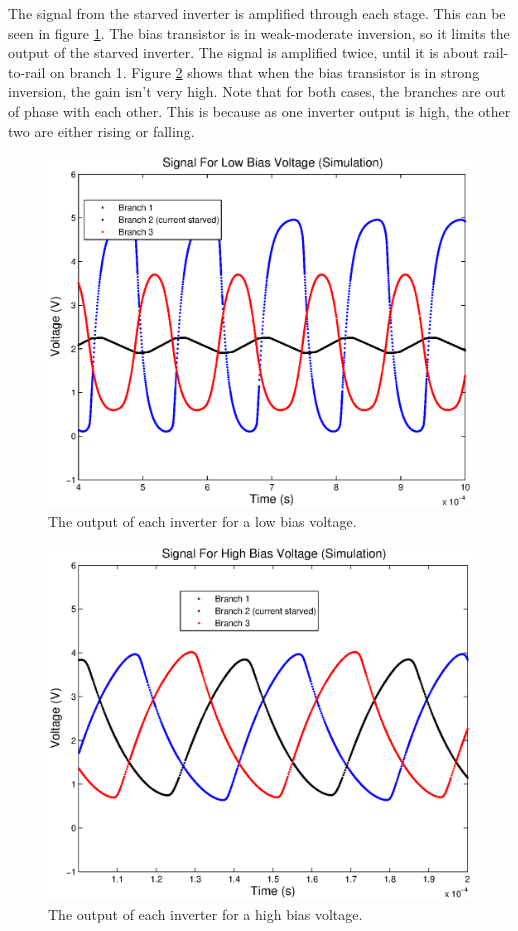 \documentclass{article}
\begin{document}
The signal from the starved inverter is amplified through each stage. This can be seen in figure \ref{lowBiasSigSim}. The bias transistor is in weak-moderate inversion, so it limits the output of the starved inverter. The signal is amplified twice, until it is about rail-to-rail on branch 1. Figure \ref{highBiasSigSim} shows that when the bias transistor is in strong inversion, the gain isn't very high. Note that for both cases, the branches are out of phase with each other. This is because as one inverter output is high, the other two are either rising or falling. \\


\begin{figure}[H]
\centering
\includegraphics[scale=.7]{lowBiasSigSim.eps}
\caption{The output of each inverter for a low bias voltage.}
\label{lowBiasSigSim}
\end{figure}

\begin{figure}[H]
\centering
\includegraphics[scale=.7]{highBiasSigSim.eps}
\caption{The output of each inverter for a high bias voltage.}
\label{highBiasSigSim}
\end{figure}
\end{document}

